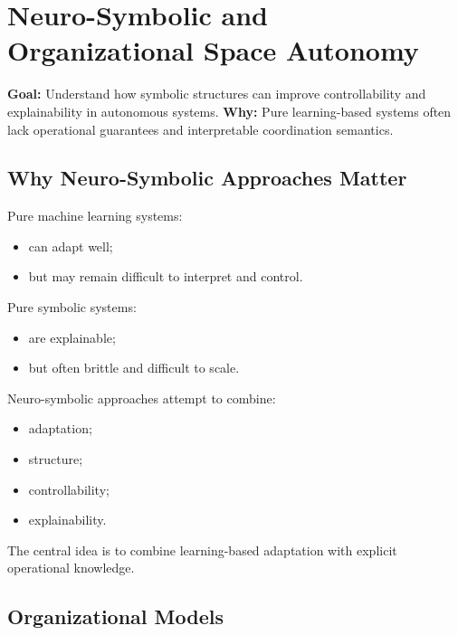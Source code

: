 \documentclass[10pt,a4paper,twocolumn]{article}
\newcommand{\lesson}[3]{
\section{#1}
\noindent
\textbf{Goal:} #2 \newline
\textbf{Why:} #3
\vspace{0.1em}
}
\begin{document}

\lesson
{Neuro-Symbolic and Organizational Space Autonomy}
{Understand how symbolic structures can improve controllability and explainability in autonomous systems.}
{Pure learning-based systems often lack operational guarantees and interpretable coordination semantics.}


\subsection{Why Neuro-Symbolic Approaches Matter}

Pure machine learning systems:
\begin{itemize}
    \item can adapt well;
    \item but may remain difficult to interpret and control.
\end{itemize}

Pure symbolic systems:
\begin{itemize}
    \item are explainable;
    \item but often brittle and difficult to scale.
\end{itemize}

Neuro-symbolic approaches attempt to combine:
\begin{itemize}
    \item adaptation;
    \item structure;
    \item controllability;
    \item explainability.
\end{itemize}

\begin{keybox}
    The central idea is to combine learning-based adaptation with explicit operational knowledge.
\end{keybox}


\subsection{Organizational Models}
\end{document}
